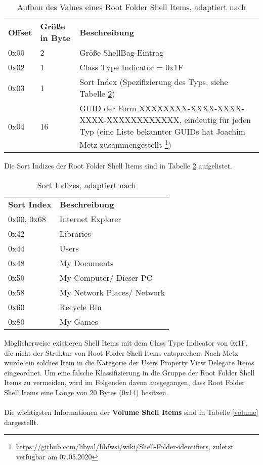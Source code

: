 \begin{longtable}{|p{}|p{}|p{}|}
	\caption{Aufbau des Values eines Root Folder Shell Items, adaptiert nach \cite{shelltype}} \label{rfs} \vspace{1em} \\
	\hline
	\cellcolor{gray!25}\textbf{Offset} & \cellcolor{gray!25}\textbf{Größe in Byte} & \cellcolor{gray!25}\textbf{Beschreibung} \\
	\hline
    0x00 & 2 & Größe ShellBag-Eintrag\\
	\hline
	0x02 & 1 & Class Type Indicator = 0x1F \\
	\hline
	0x03 & 1 & Sort Index (Spezifizierung des Typs, siehe Tabelle \ref{sort}) \\
	\hline
	0x04 & 16 & GUID der Form XXXXXXXX-XXXX-XXXX-XXXX-XXXXXXXXXXXX, eindeutig für jeden Typ \cite{guids} (eine Liste bekannter GUIDs hat Joachim Metz zusammengestellt \footnote{\url{https://github.com/libyal/libfwsi/wiki/Shell-Folder-identifiers}, zuletzt verfügbar am 07.05.2020})  \\
	\hline
\end{longtable}
\vspace{1em}

Die Sort Indizes der Root Folder Shell Items sind in Tabelle \ref{sort} aufgelistet. 

\begin{longtable}{|p{}|p{}|}
	\caption{Sort Indizes, adaptiert nach \cite{shelltype}} \label{sort} \vspace{1em} \\
	\hline
	\cellcolor{gray!25}\textbf{Sort Index} & \cellcolor{gray!25}\textbf{Beschreibung} \\
	\hline
	0x00, 0x68 & Internet Explorer\\
	\hline
	0x42 & Libraries \\
	\hline
	0x44 & Users \\
	\hline
	0x48 & My Documents \\
	\hline
	0x50 & My Computer/ Dieser PC \\
	\hline
	0x58 & My Network Places/ Network \\
	\hline
	0x60 & Recycle Bin \\
	\hline
	0x80 & My Games \\
	\hline
\end{longtable}
\vspace{1em}
Möglicherweise existieren Shell Items mit dem Class Type Indicator von 0x1F, die nicht der Struktur von Root Folder Shell Items entsprechen. Nach Metz wurde ein solches Item in die Kategorie der Users Property View Delegate Items eingeordnet. Um eine falsche Klassifizierung in die Gruppe der Root Folder Shell Items zu vermeiden, wird im Folgenden davon ausgegangen, dass Root Folder Shell Items eine Länge von 20 Bytes (0x14) besitzen. \\
\\
Die wichtigsten Informationen der \textbf{Volume Shell Items} sind in Tabelle \ref{volume} dargestellt.

